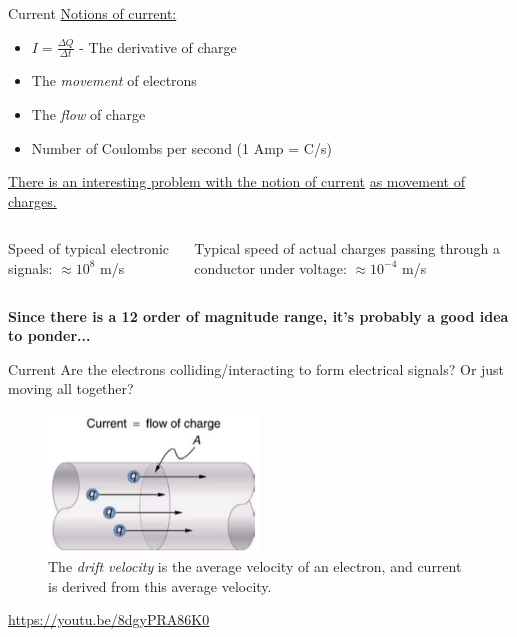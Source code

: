 \documentclass{beamer}
\begin{document}
\begin{frame}{Current}
\underline{Notions of current:}
\begin{itemize}
	\item $I = \frac{\Delta Q}{\Delta t}$ - The derivative of charge
	\item The \textit{movement} of electrons
	\item The \textit{flow} of charge
	\item Number of Coulombs per second (1 Amp = C/s)
\end{itemize}
\underline{There is an interesting problem with the notion of current} \underline{as movement of charges.} \\ \vspace{0.5cm}
\begin{columns}[T]
\begin{column}{0.5\textwidth}
Speed of typical electronic signals: $\approx 10^{8}$ m/s
\end{column}
\begin{column}{0.5\textwidth}
Typical speed of actual charges passing through a conductor under voltage: $\approx 10^{-4}$ m/s
\end{column}
\end{columns} \vspace{0.25cm}
\textbf{Since there is a 12 order of magnitude range, it's probably a good idea to ponder...}
\end{frame}

\begin{frame}{Current}
\small
Are the electrons colliding/interacting to form electrical signals?  Or just moving all together?
\begin{figure}
\includegraphics[width=0.5\textwidth]{figures/current1.png}
\caption{\label{fig:current1} The \textit{drift velocity} is the average velocity of an electron, and current is derived from this average velocity.}
\end{figure}
\url{https://youtu.be/8dgyPRA86K0}
\end{frame}
\end{document}
